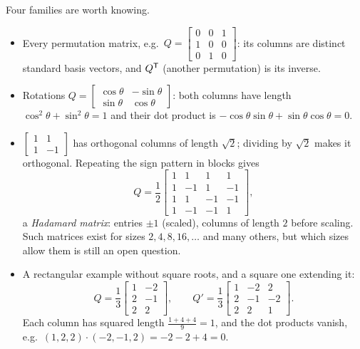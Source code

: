 \begin{example}\label{ex:u19-gallery}
Four families are worth knowing.
\begin{itemize}
  \item Every permutation matrix, e.g.\
    $Q=\left[\begin{smallmatrix}0&0&1\\1&0&0\\0&1&0\end{smallmatrix}\right]$: its columns
    are distinct standard basis vectors, and $Q^{\mathsf{T}}$ (another permutation) is its inverse.
  \item Rotations
    $Q=\begin{bmatrix}\cos\theta&-\sin\theta\\ \sin\theta&\cos\theta\end{bmatrix}$: both
    columns have length $\cos^2\theta+\sin^2\theta=1$ and their dot product is
    $-\cos\theta\sin\theta+\sin\theta\cos\theta=0$.
  \item $\begin{bmatrix}1&1\\1&-1\end{bmatrix}$ has orthogonal columns of length $\sqrt2$;
    dividing by $\sqrt2$ makes it orthogonal. Repeating the sign pattern in blocks gives
    \[
      Q=\frac12\begin{bmatrix}1&1&1&1\\1&-1&1&-1\\1&1&-1&-1\\1&-1&-1&1\end{bmatrix},
    \]
    a \emph{Hadamard matrix}: entries $\pm1$ (scaled), columns of length $2$ before
    scaling. Such matrices exist for sizes $2,4,8,16,\dots$ and many others, but which sizes
    allow them is still an open question.
  \item A rectangular example without square roots, and a square one extending it:
    \[
      Q=\frac13\begin{bmatrix}1&-2\\2&-1\\2&2\end{bmatrix},\qquad
      Q'=\frac13\begin{bmatrix}1&-2&2\\2&-1&-2\\2&2&1\end{bmatrix}.
    \]
    Each column has squared length $\frac{1+4+4}{9}=1$, and the dot products vanish, e.g.\
    $(1,2,2)\cdot(-2,-1,2)=-2-2+4=0$.
\end{itemize}
\end{example}

